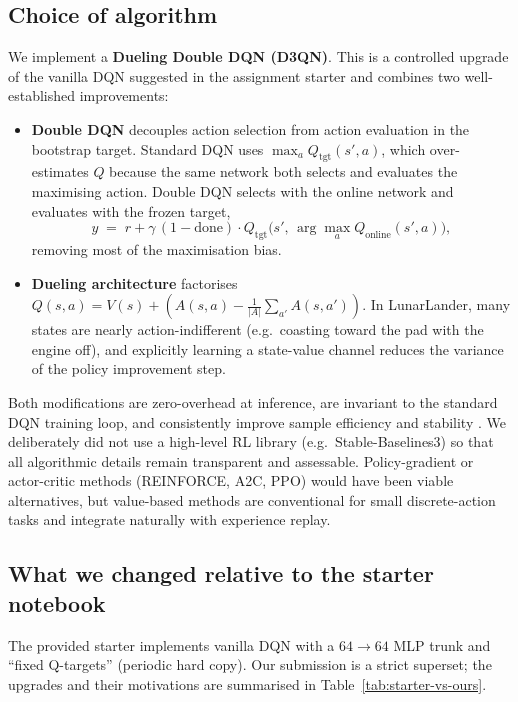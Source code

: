 \documentclass[11pt,a4paper]{article}
\begin{document}
\subsection{Choice of algorithm}
\label{sec:alg}
We implement a \textbf{Dueling Double DQN (D3QN)}. This is a controlled
upgrade of the vanilla DQN suggested in the assignment starter and
combines two well-established improvements:

\begin{itemize}
  \item \textbf{Double DQN} \cite{vanhasselt2016} decouples action
    selection from action evaluation in the bootstrap target. Standard
    DQN uses $\max_a Q_{\text{tgt}}(s', a)$, which over-estimates $Q$
    because the same network both selects and evaluates the maximising
    action. Double DQN selects with the online network and evaluates
    with the frozen target,
    \[
        y \;=\; r + \gamma\,(1-\text{done}) \cdot
                Q_{\text{tgt}}\!\bigl(s',\, \arg\max_a Q_{\text{online}}(s', a)\bigr),
    \]
    removing most of the maximisation bias.
  \item \textbf{Dueling architecture} \cite{wang2016} factorises
    $Q(s, a) = V(s) + (A(s, a) - \frac{1}{|A|}\sum_{a'} A(s, a'))$. In
    LunarLander, many states are nearly action-indifferent (e.g.\
    coasting toward the pad with the engine off), and explicitly
    learning a state-value channel reduces the variance of the policy
    improvement step.
\end{itemize}

Both modifications are zero-overhead at inference, are invariant to the
standard DQN training loop, and consistently improve sample efficiency
and stability \cite{hessel2018}. We deliberately did not use a
high-level RL library (e.g.\ Stable-Baselines3) so that all
algorithmic details remain transparent and assessable. Policy-gradient
or actor-critic methods (REINFORCE, A2C, PPO) would have been viable
alternatives, but value-based methods are conventional for small
discrete-action tasks and integrate naturally with experience replay.

\subsection{What we changed relative to the starter notebook}
The provided starter implements vanilla DQN with a $64\!\to\!64$ MLP
trunk and ``fixed Q-targets'' (periodic hard copy). Our submission is a
strict superset; the upgrades and their motivations are summarised in
Table~\ref{tab:starter-vs-ours}.
\end{document}
